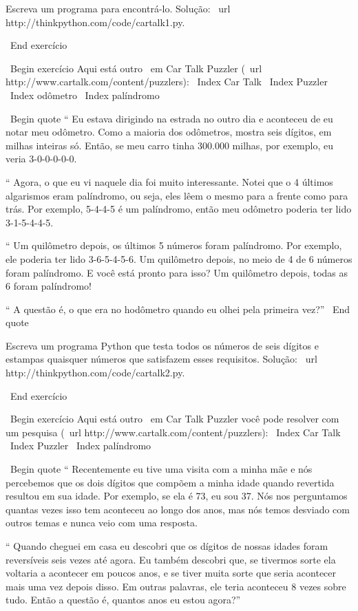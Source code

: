 \documentclass[10pt]{book}
\begin{document}
{{{{{{Escreva um programa para encontrá-lo. Solução: \ url {http://thinkpython.com/code/cartalk1.py}.

\ End {} exercício


\ Begin {} exercício
Aqui está outro {\ em Car Talk}
Puzzler (\ url {http://www.cartalk.com/content/puzzlers}):
\ Index {Car Talk}
\ Index {} Puzzler
\ Index {} odômetro
\ Index {palíndromo}

\ Begin {quote}
`` Eu estava dirigindo na estrada no outro dia e aconteceu de eu
notar meu odômetro. Como a maioria dos odômetros, mostra seis dígitos,
em milhas inteiras só. Então, se meu carro tinha 300.000
milhas, por exemplo, eu veria 3-0-0-0-0-0.

`` Agora, o que eu vi naquele dia foi muito interessante. Notei que o
4 últimos algarismos eram palíndromo, ou seja, eles lêem o mesmo para a frente como
para trás. Por exemplo, 5-4-4-5 é um palíndromo, então meu odômetro
poderia ter lido 3-1-5-4-4-5.

`` Um quilômetro depois, os últimos 5 números foram palíndromo. Por exemplo, ele
poderia ter lido 3-6-5-4-5-6. Um quilômetro depois, no meio de 4 de
6 números foram palíndromo. E você está pronto para isso? Um quilômetro depois,
todas as 6 foram palíndromo!

`` A questão é, o que era no hodômetro quando eu olhei pela primeira vez?''
\ End {quote}

Escreva um programa Python que testa todos os números de seis dígitos e estampas
quaisquer números que satisfazem esses requisitos.  
Solução: \ url {http://thinkpython.com/code/cartalk2.py}.

\ End {} exercício


\ Begin {} exercício
Aqui está outro {\ em Car Talk} Puzzler você pode resolver com um
pesquisa (\ url {http://www.cartalk.com/content/puzzlers}):
\ Index {Car Talk}
\ Index {} Puzzler
\ Index {palíndromo}

\ Begin {quote}
`` Recentemente eu tive uma visita com a minha mãe e nós percebemos que
os dois dígitos que compõem a minha idade quando revertida resultou em sua
idade. Por exemplo, se ela é 73, eu sou 37. Nós nos perguntamos quantas vezes isso tem
aconteceu ao longo dos anos, mas nós temos desviado com outros temas e
nunca veio com uma resposta.

`` Quando cheguei em casa eu descobri que os dígitos de nossas idades foram
reversíveis seis vezes até agora. Eu também descobri que, se tivermos sorte ela
voltaria a acontecer em poucos anos, e se tiver muita sorte que seria
acontecer mais uma vez depois disso. Em outras palavras, ele teria
aconteceu 8 vezes sobre tudo. Então a questão é, quantos anos eu estou agora?''

}}}}}}
\end{document}
